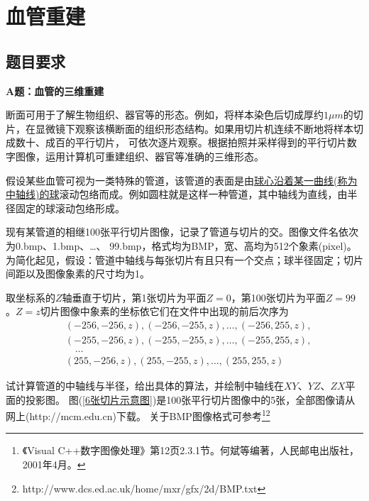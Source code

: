 
\chapter{血管重建}
\section{题目要求}
    \par
    \textbf{A题：血管的三维重建}
    \par
    断面可用于了解生物组织、器官等的形态。例如，将样本染色后切成厚约$1\mu m$的切片，在显微镜下观察该横断面的组织形态结构。如果用切片机连续不断地将样本切成数十、成百的平行切片， 可依次逐片观察。根据拍照并采样得到的平行切片数字图像，运用计算机可重建组织、器官等准确的三维形态。
    \par
    假设某些血管可视为一类特殊的管道，该管道的表面是由\uline{球心沿着某一曲线(称为中轴线)的球}滚动包络而成。例如圆柱就是这样一种管道，其中轴线为直线，由半径固定的球滚动包络形成。
    \par
    现有某管道的相继100张平行切片图像，记录了管道与切片的交。图像文件名依次为0.bmp、1.bmp、…、 99.bmp，格式均为BMP，宽、高均为512个象素(pixel)。为简化起见，假设：管道中轴线与每张切片有且只有一个交点；球半径固定；切片间距以及图像象素的尺寸均为1。
    \par
    取坐标系的$Z$轴垂直于切片，第1张切片为平面$Z=0$，第100张切片为平面$Z=99$。$Z=z$切片图像中象素的坐标依它们在文件中出现的前后次序为
    \begin{align*}
    & (-256,-256,z),(-256,-255,z),\dots,(-256,255,z),\\
    & (-255,-256,z),(-255,-255,z),\dots,(-255,255,z),\\
    & \quad \dots\\
    & ( 255,-256,z),( 255,-255,z),\dots,(255,255,z)
    \end{align*}
    \par
    试计算管道的中轴线与半径，给出具体的算法，并绘制中轴线在$XY$、$YZ$、$ZX$平面的投影图。
    图(\ref{6张切片示意图})是100张平行切片图像中的5张，全部图像请从网上(http://mcm.edu.cn)下载。
    关于BMP图像格式可参考\footnote{《Visual C++数字图像处理》第12页2.3.1节。何斌等编著，人民邮电出版社，2001年4月。}\footnote{http://www.dcs.ed.ac.uk/home/mxr/gfx/2d/BMP.txt}
